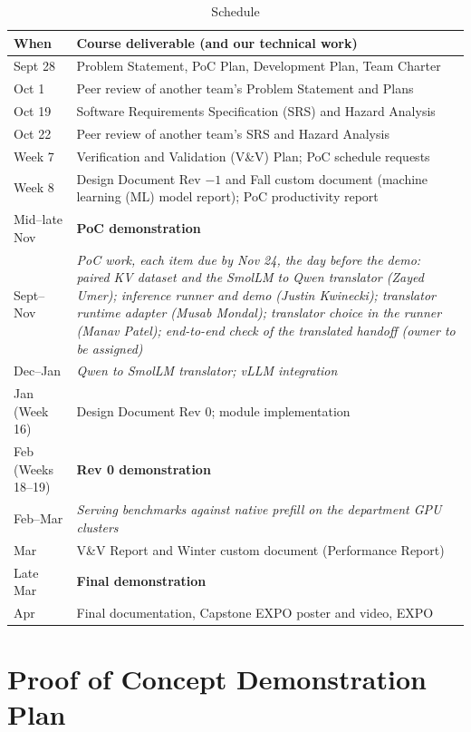 \documentclass{article}
\begin{document}
\begin{table}[ht]
\caption{Schedule} \label{TblSchedule}
\begin{tabularx}{\textwidth}{lX}
\toprule
\textbf{When} & \textbf{Course deliverable (and our technical work)}\\
\midrule
Sept 28 & Problem Statement, PoC Plan, Development Plan, Team Charter\\
Oct 1 & Peer review of another team's Problem Statement and Plans\\
Oct 19 & Software Requirements Specification (SRS) and Hazard Analysis\\
Oct 22 & Peer review of another team's SRS and Hazard Analysis\\
Week 7 & Verification and Validation (V\&V) Plan; PoC schedule requests\\
Week 8 & Design Document Rev $-1$ and Fall custom document (machine
learning (ML) model report); PoC productivity report\\
Mid--late Nov & \textbf{PoC demonstration}\\
\midrule
Sept--Nov & \emph{PoC work, each item due by Nov 24, the day before the
demo: paired KV dataset and the SmolLM to Qwen translator (Zayed Umer);
inference runner and demo (Justin Kwinecki); translator runtime adapter
(Musab Mondal); translator choice in the runner (Manav Patel); end-to-end
check of the translated handoff (owner to be assigned)}\\
Dec--Jan & \emph{Qwen to SmolLM translator; vLLM integration}\\
\midrule
Jan (Week 16) & Design Document Rev 0; module implementation\\
Feb (Weeks 18--19) & \textbf{Rev 0 demonstration}\\
\midrule
Feb--Mar & \emph{Serving benchmarks against native prefill on the
department GPU clusters}\\
\midrule
Mar & V\&V Report and Winter custom document (Performance Report)\\
Late Mar & \textbf{Final demonstration}\\
Apr & Final documentation, Capstone EXPO poster and video, EXPO\\
\bottomrule
\end{tabularx}
\end{table}

\section{Proof of Concept Demonstration Plan}
\label{sec:poc}
\end{document}
